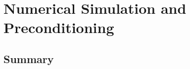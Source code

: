 \chapter{Numerical Simulation and Preconditioning}
    
    
    
    

    
    \section*{Summary}
